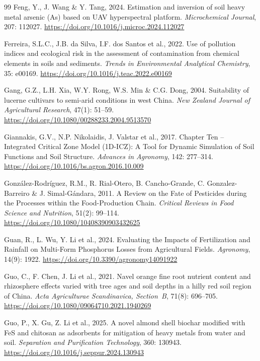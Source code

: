 \documentclass[sn-mathphys-num]{sn-jnl}
\begin{document}
\begin{thebibliography}{99}
Feng, Y., J. Wang \& Y. Tang, 2024.
Estimation and inversion of soil heavy metal arsenic (As) based on UAV
hyperspectral platform.
\textit{Microchemical Journal}, 207: 112027.
\url{https://doi.org/10.1016/j.microc.2024.112027}

Ferreira, S.L.C., J.B. da Silva, I.F. dos Santos et al., 2022.
Use of pollution indices and ecological risk in the assessment of
contamination from chemical elements in soils and sediments.
\textit{Trends in Environmental Analytical Chemistry}, 35: e00169.
\url{https://doi.org/10.1016/j.teac.2022.e00169}

Gang, G.Z., L.H. Xia, W.Y. Rong, W.S. Min \& C.G. Dong, 2004.
Suitability of lucerne cultivars to semi-arid conditions in west China.
\textit{New Zealand Journal of Agricultural Research}, 47(1): 51--59.
\url{https://doi.org/10.1080/00288233.2004.9513570}

Giannakis, G.V., N.P. Nikolaidis, J. Valstar et al., 2017.
Chapter Ten -- Integrated Critical Zone Model (1D-ICZ): A Tool for Dynamic
Simulation of Soil Functions and Soil Structure.
\textit{Advances in Agronomy}, 142: 277--314.
\url{https://doi.org/10.1016/bs.agron.2016.10.009}

Gonz\'{a}lez-Rodr\'{i}guez, R.M., R. Rial-Otero, B. Cancho-Grande,
C. Gonzalez-Barreiro \& J. Simal-G\'{a}ndara, 2011.
A Review on the Fate of Pesticides during the Processes within the
Food-Production Chain.
\textit{Critical Reviews in Food Science and Nutrition}, 51(2): 99--114.
\url{https://doi.org/10.1080/10408390903432625}

Guan, R., L. Wu, Y. Li et al., 2024.
Evaluating the Impacts of Fertilization and Rainfall on Multi-Form Phosphorus
Losses from Agricultural Fields.
\textit{Agronomy}, 14(9): 1922.
\url{https://doi.org/10.3390/agronomy14091922}

Guo, C., F. Chen, J. Li et al., 2021.
Navel orange fine root nutrient content and rhizosphere effects varied with
tree ages and soil depths in a hilly red soil region of China.
\textit{Acta Agriculturae Scandinavica, Section~B}, 71(8): 696--705.
\url{https://doi.org/10.1080/09064710.2021.1940269}

Guo, P., X. Gu, Z. Li et al., 2025.
A novel almond shell biochar modified with FeS and chitosan as adsorbents for
mitigation of heavy metals from water and soil.
\textit{Separation and Purification Technology}, 360: 130943.
\url{https://doi.org/10.1016/j.seppur.2024.130943}


\end{thebibliography}
\end{document}
